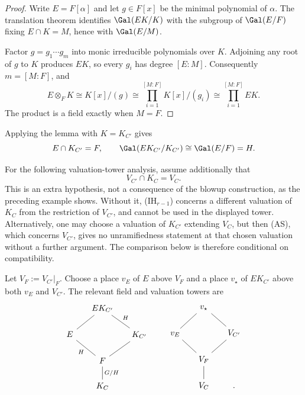 \begin{proof}
Write $E=F[\alpha]$ and let $g\in F[x]$ be the minimal polynomial of
$\alpha$. The translation theorem identifies $\Gal(EK/K)$ with the subgroup
of $\Gal(E/F)$ fixing $E\cap K=M$, hence with $\Gal(E/M)$.

Factor $g=g_1\cdots g_m$ into monic irreducible polynomials over $K$.
Adjoining any root of $g$ to $K$ produces $EK$, so every $g_i$ has degree
$[E:M]$. Consequently $m=[M:F]$, and
\[
E\otimes_FK\cong K[x]/(g)
  \cong\prod_{i=1}^{[M:F]}K[x]/(g_i)
  \cong\prod_{i=1}^{[M:F]}EK.
\]
The product is a field exactly when $M=F$.
\end{proof}

Applying the lemma with $K=K_{C'}$ gives
\[
E\cap K_{C'}=F,
\qquad
\Gal(EK_{C'}/K_{C'})\cong\Gal(E/F)=H.
\]

{\color{blue}
For the following valuation-tower analysis, assume additionally that
\[
V_{C'}\cap K_C=V_C.
\]
This is an extra hypothesis, not a consequence of the blowup construction,
as the preceding example shows. Without it, (IH$_{r-1}$) concerns a
different valuation of $K_C$ from the restriction of $V_{C'}$, and cannot
be used in the displayed tower.
{\color{red}Alternatively, one may choose a valuation
of $K_{C'}$ extending $V_C$, but then (AS), which concerns $V_{C'}$, gives
no unramifiedness statement at that chosen valuation without a further
argument.}
The comparison below is therefore conditional on compatibility.
\par}

Let $V_F:=V_{C'}|_F$. Choose a place $v_E$ of $E$ above $V_F$ and a place
$v_\star$ of $EK_{C'}$ above both $v_E$ and $V_{C'}$. The relevant field
and valuation towers are
\[
\begin{tikzcd}[row sep=1.6em, column sep=1.4em]
 &EK_{C'}\arrow[dl,dash]\arrow[dr,dash,"H"]&\\
 E\arrow[dr,dash,"H"']&&K_{C'}\arrow[dl,dash]\\
 &F\arrow[d,dash,"G/H"]&\\
 &K_C&
\end{tikzcd}
\qquad
\begin{tikzcd}[row sep=1.6em, column sep=1.4em]
 &v_\star\arrow[dl,dash]\arrow[dr,dash]&\\
 v_E\arrow[dr,dash]&&V_{C'}\arrow[dl,dash]\\
 &V_F\arrow[d,dash]&\\
 &V_C&.
\end{tikzcd}
\]

